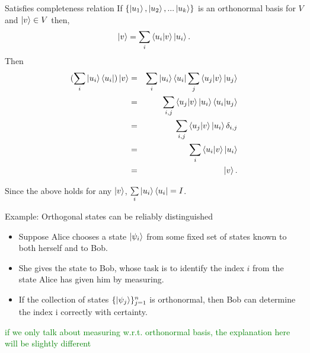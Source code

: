 \documentclass[handout, 10 pt]{beamer}
\begin{document}
\begin{frame}{Satisfies completeness relation}
 If $\{\ket{u_1}, \ket{u_2}, ...\ket{u_k}\}$ is an orthonormal basis for $V$ and $\ket{v} \in V$ then, 
$$\ket{v}=\sum\limits_i\braket{u_i|v}\ket{u_i} .$$
Then
\begin{eqnarray*}
    (\sum_i \ket{u_i}\bra{u_i})\ket{v}&=&
    \sum_i \ket{u_i}\bra{u_i}\sum_j \braket{u_j|v} \ket{u_j}\\
    &=& \sum_{i,j}\braket{u_j|v}\ket{u_i}\braket{u_i|u_j}\\
    &=& \sum_{i,j}\braket{u_j|v}\ket{u_i}\delta_{i,j}\\
    &=&\sum_i \braket{u_i|v}\ket{u_i}\\
    &=&\ket{v}.
\end{eqnarray*}


Since the above holds for any $\ket{v}$, $\sum\limits_i \ket{u_i}\bra{u_i}=I$.   
\end{frame}


\begin{frame}{Example: Orthogonal states can be reliably distinguished}
\begin{block}{}
\begin{itemize}
    \item Suppose Alice chooses a state $\ket{\psi_i}$ from some fixed set of states known to both herself and to Bob.
    \pause
    \item She gives the state to Bob, whose task is to identify the index $i$ from the state Alice has given him by measuring.
    \pause
    \item If the collection of states $\{\ket{\psi_j}\}_{j=1}^n$ is orthonormal, then Bob can determine the index i correctly with certainty.
\end{itemize}
\end{block}
\textcolor{green}{if we only talk about measuring w.r.t. orthonormal basis, the explanation here will be slightly different}
\end{frame}
\end{document}
